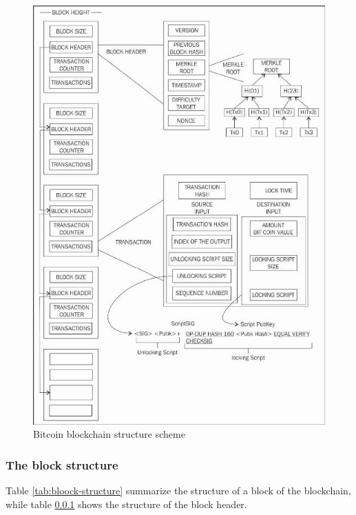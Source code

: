 \begin{figure}[!htb]
	\centering
	\includegraphics[width=0.9\linewidth]{img/bitcoin-blockchain-scheme.png}
	\caption{Bitcoin blockchain structure scheme}
	\label{fig:bitcoin-blockchain}
\end{figure}


\subsubsection{The block structure} Table \ref{tab:bloock-structure} summarize
the structure of a block of the blockchain, while table \ref{} shows the structure
of the block header.

\begin{table}[h!]
\centering
{}
\caption{Structure of a Bitcoin block}
\label{tab:bloock-structure}
\end{table}



